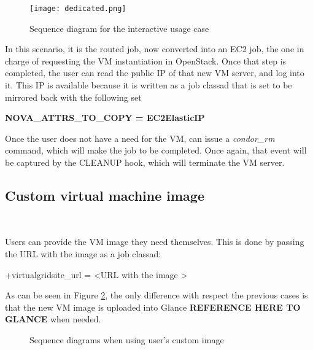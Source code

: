 \documentclass[a4paper]{jpconf}
\begin{document}
\begin{figure}[h]
    \centering
    \texttt{[image: dedicated.png]}
    \caption{Sequence diagram for the interactive usage case}
    \label{fig:interactive}
\end{figure}

In this scenario, it is the routed job, now converted into an EC2 job, 
the one in charge of requesting the VM instantiation in OpenStack.
Once that step is completed, the user can read the public IP of that new VM server, and log into it. 
This IP is available because it is written as a job classad that is set to be mirrored back with the following set

\begin{center}
    \colorbox{htcondorbox}{
        \begin{minipage}{\textwidth}
        \small
            \bf{NOVA\_ATTRS\_TO\_COPY = EC2ElasticIP
            }
        \end{minipage}
    }
\end{center}

Once the user does not have a need for the VM, can issue a \textit{condor\_rm} command, 
which will make the job to be completed. 
Once again, that event will be captured by the CLEANUP hook, which will terminate the VM server. 



\subsection{Custom virtual machine image}

~

Users can provide the VM image they need themselves. 
This is done by passing the URL with the image as a job classad:
\begin{center}
    +virtualgridsite\_url = \textless URL with the image \textgreater
\end{center}

As can be seen in Figure \ref{fig:custom}, 
the only difference with respect the previous cases is that the new VM image is uploaded into Glance \textbf{REFERENCE HERE TO GLANCE} when needed.

\begin{figure}[h]
    \centering
    \qquad
    \caption{Sequence diagrams when using user's custom image}%
    \label{fig:custom}%
\end{figure}
\end{document}
